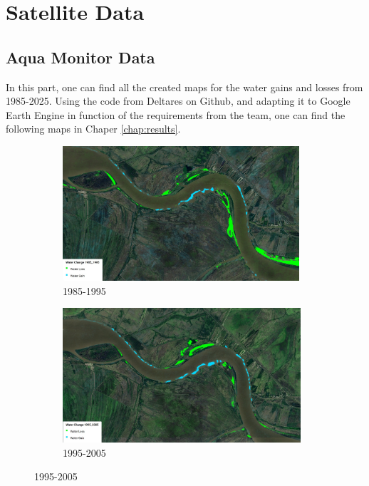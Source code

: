 \chapter{Satellite Data}
\label{Appendix: Satellite Data}
\section{Aqua Monitor Data}
In this part, one can find all the created maps for the water gains and losses from 1985-2025. 
Using the code from Deltares on Github, and adapting it to Google Earth Engine in function of the requirements from the team, one can find the following maps in Chaper \ref{chap:results}.

\begin{figure}[H]
    \centering
    \begin{subfigure}[b]{0.48\textwidth}
        \includegraphics[width=\linewidth, height =5cm]{figures/appendix-g/1985-1995.jpg}
        \caption{1985-1995}
        \label{fig:second}
    \end{subfigure}
    \hfill
    \begin{subfigure}[b]{0.48\textwidth}
        \includegraphics[width=\linewidth, height =5cm]{figures/appendix-g/1995-2005.jpg}
        \caption{1995-2005}
        \label{fig:second}
    \end{subfigure}
    

    \vspace{0.5cm}


\end{figure}
